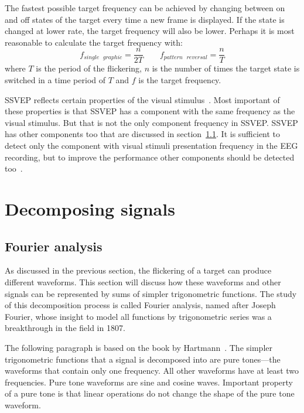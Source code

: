 The fastest possible target frequency can be achieved by changing between on and off states of the target every time a new frame is displayed. If the state is changed at lower rate, the \gls{target} frequency will also be lower. Perhaps it is most reasonable to calculate the \gls{target} frequency with:
\begin{equation}
	f_{single\mbox{ }graphic} = \frac{n}{2T} \qquad f_{pattern\mbox{ }reversal} = \frac{n}{T}
\end{equation}
where $T$ is the period of the \gls{flickering}, $n$ is the number of times the target state is switched in a time period of $T$ and $f$ is the target frequency.

\gls{SSVEP} reflects certain properties of the visual stimulus~\cite{ssvep_response}. Most important of these properties is that \gls{SSVEP} has a component with the same frequency as the visual stimulus. But that is not the only component frequency in \gls{SSVEP}. \gls{SSVEP} has other components too that are discussed in section~\ref{sec:fourier}. It is sufficient to detect only the component with visual stimuli presentation frequency in the \gls{EEG} recording, but to improve the performance other components should be detected too~\cite{harmonic_imrpovement}.

\section{Decomposing signals}

\subsection{Fourier analysis}
\label{sec:fourier}

As discussed in the previous section, the flickering of a target can produce different waveforms. This section will discuss how these waveforms and other signals can be represented by sums of simpler trigonometric functions. The study of this decomposition process is called Fourier analysis, named after Joseph Fourier, whose insight to model all functions by trigonometric series was a breakthrough in the field in 1807.

The following paragraph is based on the book by Hartmann~\cite{pure_tone}. The simpler trigonometric functions that a signal is decomposed into are pure tones---the waveforms that contain only one frequency. All other waveforms have at least two frequencies. Pure tone waveforms are sine and cosine waves. Important property of a pure tone is that linear operations do not change the shape of the pure tone waveform.

